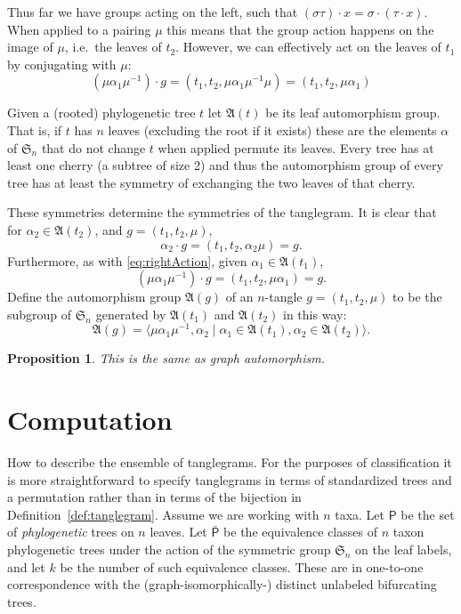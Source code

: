 \documentclass{amsart}
\newtheorem{proposition}[theorem]{Proposition}
\newcommand{\fS}{\mathfrak S}
\newcommand{\fA}{\mathfrak A}
\newcommand{\pairing}{\mu}
\newcommand{\ptree}{\mathsf{P}}
\newcommand{\ptequiv}{\bar{\ptree}}  %
\begin{document}
Thus far we have groups acting on the left, such that $(\sigma \tau) \cdot x = \sigma \cdot (\tau \cdot x)$.
When applied to a pairing $\mu$ this means that the group action happens on the image of $\mu$, i.e.\ the leaves of $t_2$.
However, we can effectively act on the leaves of $t_1$ by conjugating with $\pairing$:
\begin{equation}
\label{eq:rightAction}
(\pairing \alpha_1 \pairing^{-1}) \cdot g
= (t_1, t_2, \pairing \alpha_1 \pairing^{-1} \pairing)
= (t_1, t_2, \pairing \alpha_1)
\end{equation}

Given a (rooted) phylogenetic tree $t$ let $\fA(t)$ be its leaf automorphism group.
That is, if $t$ has $n$ leaves (excluding the root if it exists) these are the elements $\alpha$ of $\fS_n$ that do not change $t$ when applied permute its leaves.
Every tree has at least one cherry (a subtree of size 2) and thus the automorphism group of every tree has at least the symmetry of exchanging the two leaves of that cherry.

These symmetries determine the symmetries of the tanglegram.
It is clear that for $\alpha_2 \in \fA(t_2)$, and $g = (t_1, t_2, \pairing)$,
\[
\alpha_2 \cdot g = (t_1, t_2, \alpha_2 \pairing) = g.
\]
Furthermore, as with \eqref{eq:rightAction}, given $\alpha_1 \in \fA(t_1)$,
\[
(\pairing \alpha_1 \pairing^{-1}) \cdot g = (t_1, t_2, \pairing \alpha_1) = g.
\]
Define the automorphism group $\fA(g)$ of an $n$-tangle $g = (t_1, t_2, \pairing)$ to be the subgroup of $\fS_n$ generated by $\fA(t_1)$ and $\fA(t_2)$ in this way:
\[
\fA(g) = \langle \pairing \alpha_1 \pairing^{-1}, \alpha_2 \mid \alpha_1 \in \fA(t_1), \alpha_2 \in \fA(t_2) \rangle.
\]
\begin{proposition}
This is the same as graph automorphism.
\end{proposition}


\section{Computation}
How to describe the ensemble of tanglegrams.
For the purposes of classification it is more straightforward to specify tanglegrams in terms of standardized trees and a permutation rather than in terms of the bijection in Definition~\ref{def:tanglegram}.
Assume we are working with $n$ taxa.
Let $\ptree$ be the set of \emph{phylogenetic} trees on $n$ leaves.
Let $\ptequiv$ be the equivalence classes of $n$ taxon phylogenetic trees under the action of the symmetric group $\fS_n$ on the leaf labels, and let $k$ be the number of such equivalence classes.
These are in one-to-one correspondence with the (graph-isomorphically-) distinct unlabeled bifurcating trees.
\end{document}
